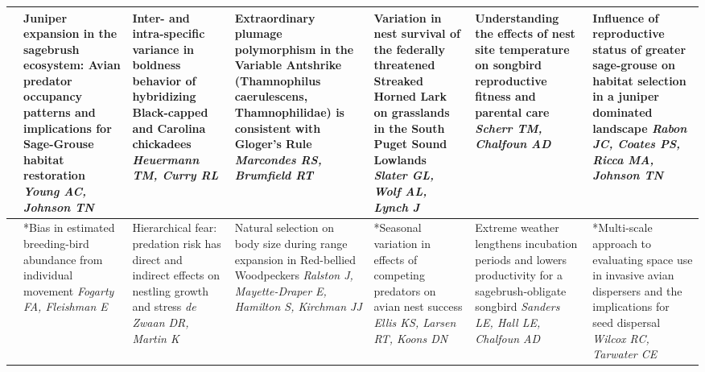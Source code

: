 \begin{tabular}{|x{0.75cm}|x{2.25cm}|x{2.25cm}|x{2.25cm}|x{2.25cm}|x{2.25cm}|x{2.25cm}|}
&Juniper expansion in the sagebrush ecosystem: Avian predator occupancy patterns and implications for Sage-Grouse habitat restoration \newline \newline \textit{Young AC, Johnson TN} & Inter- and intra-specific variance in boldness behavior of hybridizing Black-capped and Carolina chickadees \newline \newline \textit{Heuermann TM, Curry RL} & Extraordinary plumage polymorphism in the Variable Antshrike (Thamnophilus caerulescens, Thamnophilidae) is consistent with Gloger’s Rule \newline \newline \textit{Marcondes RS, Brumfield RT} & Variation in nest survival of the federally threatened Streaked Horned Lark on grasslands in the South Puget Sound Lowlands \newline \newline \textit{Slater GL, Wolf AL, Lynch J} & Understanding the effects of nest site temperature on songbird reproductive fitness and parental care \newline \newline \textit{Scherr TM, Chalfoun AD} & Influence of reproductive status of greater sage-grouse on habitat selection in a juniper dominated landscape \newline \newline \textit{Rabon JC, Coates PS, Ricca MA, Johnson TN}\\
\hline
{}&*Bias in estimated breeding-bird abundance from individual movement \newline \newline \textit{Fogarty FA, Fleishman E} & Hierarchical fear: predation risk has direct and indirect effects on nestling growth and stress \newline \newline \textit{de Zwaan DR, Martin K} & Natural selection on body size during range expansion in Red-bellied Woodpeckers \newline \newline \textit{Ralston J, Mayette-Draper E, Hamilton S, Kirchman JJ} & *Seasonal variation in effects of competing predators on avian nest success \newline \newline \textit{Ellis KS, Larsen RT, Koons DN} & Extreme weather lengthens incubation periods and lowers productivity for a sagebrush-obligate songbird \newline \newline \textit{Sanders LE, Hall LE, Chalfoun AD} & *Multi-scale approach to evaluating space use in invasive avian dispersers and the implications for seed dispersal \newline \newline \textit{Wilcox RC, Tarwater CE}\\

\end{tabular}
